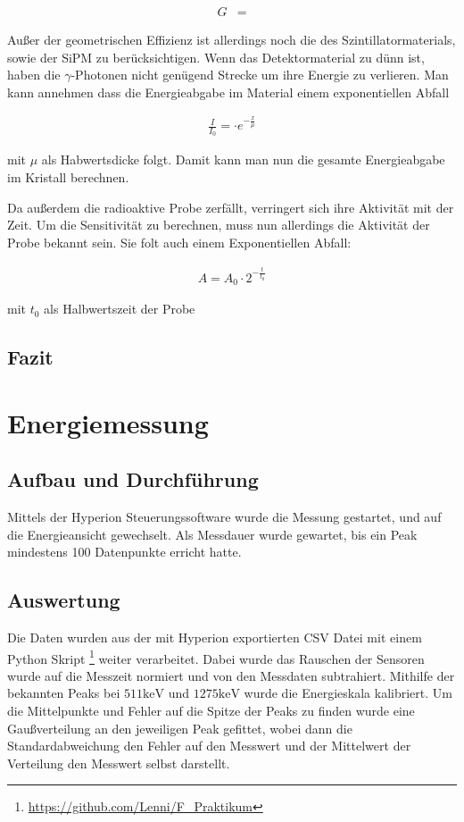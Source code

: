 \documentclass[12pt,twoside,a4paper]{scrartcl}
\begin{document}
			\begin{align*}
				G &=
			\end{align*}

			Außer der geometrischen Effizienz ist allerdings noch die des Szintillatormaterials, sowie der SiPM zu berücksichtigen. Wenn das Detektormaterial zu dünn ist, haben die $\gamma$-Photonen nicht genügend Strecke um ihre Energie zu verlieren. Man kann annehmen dass die Energieabgabe im Material einem exponentiellen Abfall

			\begin{align*}
				\frac{I}{I_0} =  \cdot e^{-\frac{x}{\mu}}
			\end{align*}

			mit $\mu$ als Habwertsdicke folgt. Damit kann man nun die gesamte Energieabgabe im Kristall berechnen.

			Da außerdem die radioaktive Probe zerfällt, verringert sich ihre Aktivität mit der Zeit. Um die Sensitivität zu berechnen, muss nun allerdings die Aktivität der Probe bekannt sein. Sie folt auch einem Exponentiellen Abfall:

			\begin{align*}
				A = A_0 \cdot 2^{- \frac{t}{t_0}}
			\end{align*}

			mit $t_0$ als Halbwertszeit der Probe

		\subsection{Fazit}



	\section{Energiemessung}

	\subsection{Aufbau und Durchführung}
		Mittels der Hyperion Steuerungssoftware wurde die Messung gestartet, und auf die Energieansicht gewechselt. Als Messdauer wurde gewartet, bis ein Peak mindestens 100 Datenpunkte erricht hatte.


	\subsection{Auswertung}

		Die Daten wurden aus der mit Hyperion exportierten CSV Datei mit einem Python Skript \footnote{\url{https://github.com/Lenni/F_Praktikum}} weiter verarbeitet. Dabei wurde das Rauschen der Sensoren wurde auf die Messzeit normiert und von den Messdaten subtrahiert. Mithilfe der bekannten Peaks bei $511 \si{\kilo \electronvolt}$ und $1275 \si{\kilo \electronvolt}$ wurde die Energieskala kalibriert. Um die Mittelpunkte und Fehler auf die Spitze der Peaks zu finden wurde eine Gaußverteilung an den jeweiligen Peak gefittet, wobei dann die Standardabweichung den Fehler auf den Messwert und der Mittelwert der Verteilung den Messwert selbst darstellt.
\end{document}
